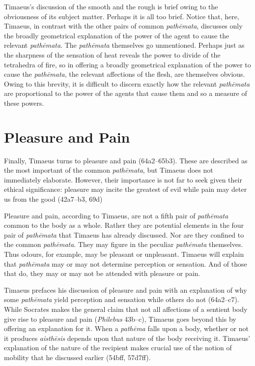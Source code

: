 Timaeus's discussion of the smooth and the rough is brief owing to the obviousness of its subject matter. Perhaps it is all too brief. Notice that, here, Timaeus, in contrast with the other pairs of common \emph{pathēmata}, discusses only the broadly geometrical explanation of the power of the agent to cause the relevant \emph{pathēmata}. The \emph{pathēmata} themselves go unmentioned. Perhaps just as the sharpness of the sensation of heat reveals the power to divide of the tetrahedra of fire, so in offering a broadly geometrical explanation of the power to cause the \emph{pathēmata}, the relevant affections of the flesh, are themselves obvious. Owing to this brevity, it is difficult to discern exactly how the relevant \emph{pathēmata} are proportional to the power of the agents that cause them and so a measure of these powers.


\section{Pleasure and Pain} %
\label{sec:pleasure_and_pain}

Finally, Timaeus turns to pleasure and pain (64a2–65b3). These are described as the most important of the common \emph{pathēmata}, but Timaeus does not immediately elaborate. However, their importance is not far to seek given their ethical significance: pleasure may incite the greatest of evil while pain may deter us from the good (42a7--b3, 69d)

Pleasure and pain, according to Timaeus, are not a fifth pair of \emph{pathēmata} common to the body as a whole. Rather they are potential elements in the four pair of \emph{pathēmata} that Timaeus has already discussed. Nor are they confined to the common \emph{pathēmata}. They may figure in the peculiar \emph{pathēmata} themselves. Thus odours, for example, may be pleasant or unpleasant. Timaeus will explain that \emph{pathēmata} may or may not determine perception or sensation. And of those that do, they may or may not be attended with pleasure or pain.

Timaeus prefaces his discussion of pleasure and pain with an explanation of why some \emph{pathēmata} yield perception and sensation while others do not (64a2--c7). While Socrates makes the general claim that not all affections of a sentient body give rise to pleasure and pain (\emph{Philebus} 43b--c), Timaeus goes beyond this by offering an explanation for it.  When a \emph{pathēma} falls upon a body, whether or not it produces \emph{aisthēsis} depends upon that nature of the body receiving it. Timaeus' explanation of the nature of the recipient makes crucial use of the notion of mobility that he discussed earlier (54bff, 57d7ff). 

